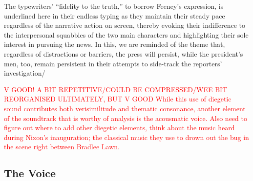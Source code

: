 The typewriters’ ``fidelity to the truth,” to borrow Feeney’s expression, is underlined here in their endless typing as they maintain their steady pace regardless of the narrative action on screen, thereby evoking their indifference to the interpersonal squabbles of the two main characters and highlighting their sole interest in pursuing the news.
In this, we are reminded of the theme that, regardless of distractions or barriers, the press will persist, while the president’s men, too, remain persistent in their attempts to side-track the reporters’ investigation/

\textcolor{red}{V GOOD! A BIT REPETITIVE/COULD BE COMPRESSED/WEE BIT REORGANISED ULTIMATELY, BUT V GOOD
While this use of diegetic sound contributes both verisimilitude and thematic consonance, another element of the soundtrack that is worthy of analysis is the acousmatic voice.
Also need to figure out where to add other diegetic elements, think about the music heard during Nixon's inauguration; the classical music they use to drown out the bug in the scene right between Bradlee Lawn.}




\subsection{The Voice}

